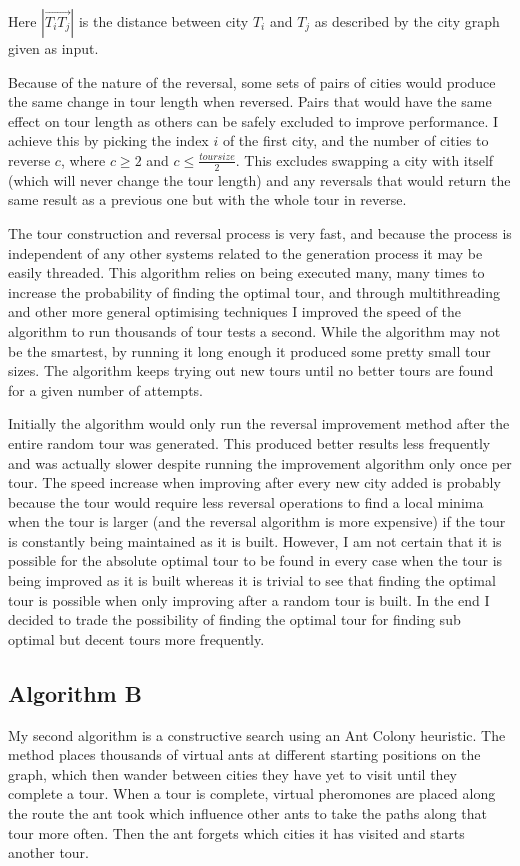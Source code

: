 \documentclass[a4paper,11pt]{article}
\begin{document}
\noindent
Here $|\overrightarrow{{T_i}{T_j}}|$ is the distance between city $T_i$ and
$T_j$ as described by the city graph given as input.

Because of the nature of the reversal, some sets of pairs of cities would 
produce the same change in tour length when reversed. Pairs that would have
the same effect on tour length as others can be safely excluded to improve 
performance. I achieve this by picking the index $i$ of the first city, and the 
number of cities to reverse $c$, where $c \ge 2$ and
$c \le \frac{toursize}{2}$. This excludes swapping a city with itself (which
will never change the tour length) and any reversals that would return the same 
result as a previous one but with the whole tour in reverse.

The tour construction and reversal process is very fast, and because the
process is independent of any other systems related to the generation process
it may be easily threaded. This algorithm relies on being executed many, many
times to increase the probability of finding the optimal tour, and through
multithreading and other more general optimising techniques I improved the
speed of the algorithm to run thousands of tour tests a second. While the
algorithm may not be the smartest, by running it long enough it produced some
pretty small tour sizes. The algorithm keeps trying out new tours until no
better tours are found for a given number of attempts.

Initially the algorithm would only run the reversal improvement method after
the entire random tour was generated. This produced better results less
frequently and was actually slower despite running the improvement algorithm
only once per tour. The speed increase when improving after every new city
added is probably because the tour would require less reversal operations to
find a local minima when the tour is larger (and the reversal algorithm is more
expensive) if the tour is constantly being maintained as it is built. However,
I am not certain that it is possible for the absolute optimal tour to be found
in every case when the tour is being improved as it is built whereas it is
trivial to see that finding the optimal tour is possible when only improving
after a random tour is built. In the end I decided to trade the possibility of
finding the optimal tour for finding sub optimal but decent tours more
frequently.

\subsection{Algorithm B}
My second algorithm is a constructive search using an Ant Colony heuristic.
The method places thousands of virtual ants at different starting positions on
the graph, which then wander between cities they have yet to visit until they
complete a tour. When a tour is complete, virtual pheromones are placed along
the route the ant took which influence other ants to take the paths along that
tour more often. Then the ant forgets which cities it has visited and starts
another tour.
\end{document}
